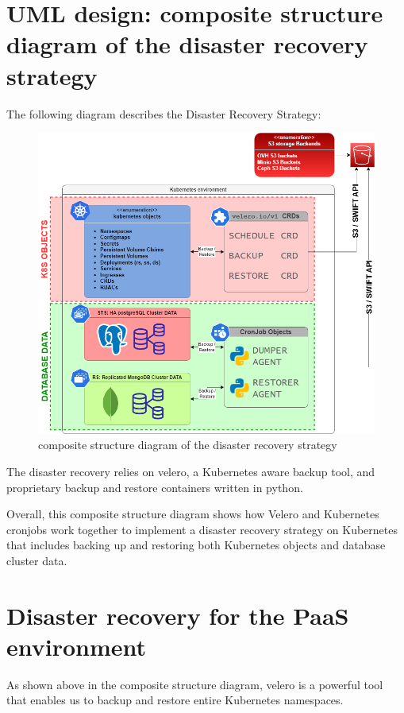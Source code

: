\section{UML design: composite structure diagram of the disaster recovery strategy }

The following diagram describes the Disaster Recovery Strategy: 

\begin{figure}[H]\centering
    \includegraphics[width=1.0\textwidth,angle=00]{assets/f56.png}
    \caption{composite structure diagram of the disaster recovery strategy }
    \label{fig:f56}
\end{figure}

The disaster recovery relies on velero, a Kubernetes aware backup tool, and proprietary backup and restore containers written in python. 

Overall, this composite structure diagram shows how Velero and Kubernetes cronjobs work together to implement a disaster recovery strategy on Kubernetes that includes backing up and restoring both Kubernetes objects and database cluster data. 

\section{Disaster recovery for the PaaS environment }

As shown above in the composite structure diagram, velero is a powerful tool that enables us to backup and restore entire Kubernetes namespaces. 

